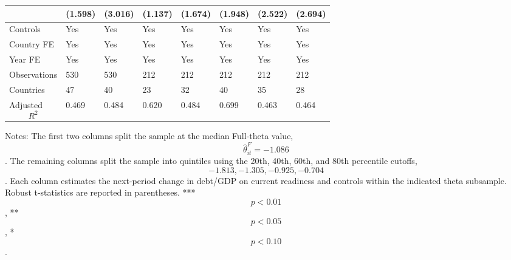 \begin{table}[H]
\begin{threeparttable}
\begin{tabularx}{\textwidth}{lYYYYYYY}
  & (1.598) & (3.016) & (1.137) & (1.674) & (1.948) & (2.522) & (2.694) \\
\midrule
Controls & Yes & Yes & Yes & Yes & Yes & Yes & Yes \\
Country FE & Yes & Yes & Yes & Yes & Yes & Yes & Yes \\
Year FE & Yes & Yes & Yes & Yes & Yes & Yes & Yes \\
Observations & 530 & 530 & 212 & 212 & 212 & 212 & 212 \\
Countries & 47 & 40 & 23 & 32 & 40 & 35 & 28 \\
Adjusted $$R^2$$ & 0.469 & 0.484 & 0.620 & 0.484 & 0.699 & 0.463 & 0.464 \\
\bottomrule
\end{tabularx}
\begin{tablenotes}[flushleft]\footnotesize
\item Notes: The first two columns split the sample at the median Full-theta value, $$\widehat{\theta}^{F}_{it}=-1.086$$. The remaining columns split the sample into quintiles using the 20th, 40th, 60th, and 80th percentile cutoffs, $$-1.813, -1.305, -0.925, -0.704$$. Each column estimates the next-period change in debt/GDP on current readiness and controls within the indicated theta subsample. Robust t-statistics are reported in parentheses. *** $$p<0.01$$, ** $$p<0.05$$, * $$p<0.10$$.
\end{tablenotes}
\end{threeparttable}
\end{table}
